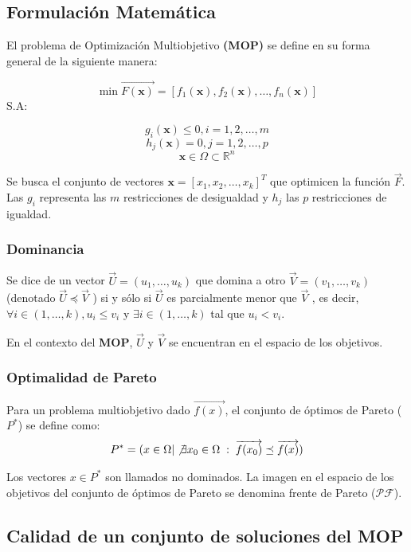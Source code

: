 \documentclass[letterpaper,10pt]{article}
\begin{document}
\subsection{Formulación Matemática}
El problema de Optimización Multiobjetivo \textbf{(MOP)} se define en su forma general de la siguiente manera:
 
$$\min \overrightarrow{F(\bm{x})} = \left[ f_1(\bm{x}), f_2(\bm{x}) , \dots, f_n(\bm{x}) \right] $$
S.A:
 
$$g_i(\bm{x}) \leq 0, i=1,2,\dots,m$$
$$h_j(\bm{x}) = 0, j=1,2,\dots,p$$
$$\bm{x} \in \Omega \subset \mathbb{R}^n$$

Se busca el conjunto de vectores $\bm{x}=[x_1,x_2,\dots,x_k]^T$ que optimicen la función $\overrightarrow{F}$. Las $g_i$ representa las $m$ restricciones de desigualdad y $h_j$ las $p$ restricciones de igualdad.

\subsubsection{Dominancia}

Se dice de un vector $\overrightarrow{U}= (u_1 ,\dots, u_k )$ que domina a otro $\overrightarrow{V}= (v_1 ,\dots, v_k )$ (denotado $\overrightarrow{U} \preceq \overrightarrow{V}$ ) si y sólo si $\overrightarrow{U}$ es parcialmente menor que $\overrightarrow{V}$ , es decir,
$\forall i \in (1,\dots, k), u_i \leq v_i$ y $\exists i \in (1,\dots, k)$ tal que  $u_i<v_i$.

En el contexto del \textbf{MOP},  $\overrightarrow{U}$ y $\overrightarrow{V}$ se encuentran en el espacio de los objetivos.
 
\subsubsection{Optimalidad de Pareto}

Para un problema multiobjetivo dado $\overrightarrow{f(x)}$, el conjunto de óptimos de Pareto ($P^*$) se define como:
$$P^* = ( x \in \Omega | \not\exists x_0 \in \Omega \; : \; \overrightarrow{f(x_0)} \preceq \overrightarrow{f(x)})$$
 
Los vectores $x \in P^*$ son llamados no dominados. La imagen en el espacio de los objetivos del conjunto de óptimos de Pareto se denomina frente de Pareto ($\mathcal{PF}$).
 
 
\subsection{Calidad de un conjunto de soluciones del MOP}
 
\end{document}
